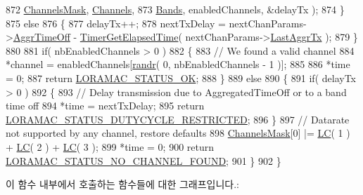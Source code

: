 \begin{DoxyCode}
872                                                       \mbox{\hyperlink{_region_e_u433_8c_a2188957b5ca6af8092154d7ccbfa5757}{ChannelsMask}}, 
      \mbox{\hyperlink{_region_e_u433_8c_a989ac3355f1ed5b534b3940af3deeb14}{Channels}},
873                                                       \mbox{\hyperlink{_region_e_u433_8c_a6c5b6e34893684b2def82b051e03096b}{Bands}}, enabledChannels, &delayTx );
874     \}
875     \textcolor{keywordflow}{else}
876     \{
877         delayTx++;
878         nextTxDelay = nextChanParams->\mbox{\hyperlink{structs_next_chan_params_a3609676d2d3b7c00e25615324b35cb26}{AggrTimeOff}} - 
      \mbox{\hyperlink{time_server_8c_a9ca7e27f3d6474daff63f2e093a2e91e}{TimerGetElapsedTime}}( nextChanParams->\mbox{\hyperlink{structs_next_chan_params_a381b728f60b185ecf3313e974c18768b}{LastAggrTx}} );
879     \}
880 
881     \textcolor{keywordflow}{if}( nbEnabledChannels > 0 )
882     \{
883         \textcolor{comment}{// We found a valid channel}
884         *channel = enabledChannels[\mbox{\hyperlink{utilities_8c_af5d8ad6dae489ac64821e7d4f004595d}{randr}}( 0, nbEnabledChannels - 1 )];
885 
886         *time = 0;
887         \textcolor{keywordflow}{return} \mbox{\hyperlink{group___l_o_r_a_m_a_c_gga1d18f26b344040b3ec5c3db662919661a03db5fca052313edb3823c014b653a74}{LORAMAC\_STATUS\_OK}};
888     \}
889     \textcolor{keywordflow}{else}
890     \{
891         \textcolor{keywordflow}{if}( delayTx > 0 )
892         \{
893             \textcolor{comment}{// Delay transmission due to AggregatedTimeOff or to a band time off}
894             *time = nextTxDelay;
895             \textcolor{keywordflow}{return} \mbox{\hyperlink{group___l_o_r_a_m_a_c_gga1d18f26b344040b3ec5c3db662919661a0c982ada0769ecee2e1041fb6945ddd4}{LORAMAC\_STATUS\_DUTYCYCLE\_RESTRICTED}};
896         \}
897         \textcolor{comment}{// Datarate not supported by any channel, restore defaults}
898         \mbox{\hyperlink{_region_e_u433_8c_a2188957b5ca6af8092154d7ccbfa5757}{ChannelsMask}}[0] |= \mbox{\hyperlink{group___r_e_g_i_o_n_ga12fa17e5c1016e01a9d82c25027deb1b}{LC}}( 1 ) + \mbox{\hyperlink{group___r_e_g_i_o_n_ga12fa17e5c1016e01a9d82c25027deb1b}{LC}}( 2 ) + \mbox{\hyperlink{group___r_e_g_i_o_n_ga12fa17e5c1016e01a9d82c25027deb1b}{LC}}( 3 );
899         *time = 0;
900         \textcolor{keywordflow}{return} \mbox{\hyperlink{group___l_o_r_a_m_a_c_gga1d18f26b344040b3ec5c3db662919661a393266a9952cf6617917f1fce181efcd}{LORAMAC\_STATUS\_NO\_CHANNEL\_FOUND}};
901     \}
902 \}
\end{DoxyCode}
이 함수 내부에서 호출하는 함수들에 대한 그래프입니다.\+:
\mbox{\label{group___r_e_g_i_o_n_e_u433_ga3a7bb7e75de6bfc5ef4edc1c934f5a50}} 
